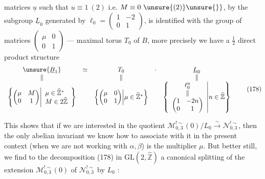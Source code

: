 matrices \unsure{$\{$} $\underline u$  such that $u\equiv1\ (2)$ i.e. $M\equiv0\ \unsure{(2)}\unsure{\}}$, by the  subgroup $\underline L_0$ generated by $\ell_0=\begin{pmatrix}1&-2\\0&1\end{pmatrix}$, is identified with the group of matrices $\begin{pmatrix}\mu&0\\0&1\end{pmatrix}$ ---  maximal torus $T_0$ of $B$, more precisely we have a $\frac12$ direct product structure
\[
\begin{array}{ccccc}
\unsure{\underline B_1}&\simeq&T_0&\cdot&\underline L_0\\
\Vert&&\Vert&&\Vert\\
\left\{\begin{pmatrix}\mu&M\\0&1\end{pmatrix}\middle|\begin{array}{l}\mu\in\widehat{\mathbb Z}^{*}\\M\in2\widehat{\mathbb Z}\end{array}\right\}&&
\left\{\begin{pmatrix}\mu&0\\0&1\end{pmatrix}\middle|\mu\in\widehat{\mathbb Z}^{*}\right\}&&
\left\{\begin{array}{c}\ell_0^n\\\Vert\\\begin{pmatrix}1&-2n\\0&1\end{pmatrix}\end{array}\middle|n\in\widehat{\mathbb Z}\right\}
\end{array}
\tag{178}
\]

This shows that if we are interested in the quotient $\mathcal M_{0,3}^{!\sim}(0)/L_0\xrightarrow{\sim}\mathcal N_{0,3}^{!\sim}$, then the only abelian invariant we know how to associate with it in the present context (when we are not working with $\alpha,\beta$) is the multiplier $\mu$. But better still, we find  to the decomposition (178) in $\mathrm{GL}(2,\widehat{\mathbb Z})$ a canonical splitting of the extension $\mathcal M_{0,3}^{!\sim}(0)$ of $\mathcal N_{0,3}^{!\sim}$ by $L_0$ :

